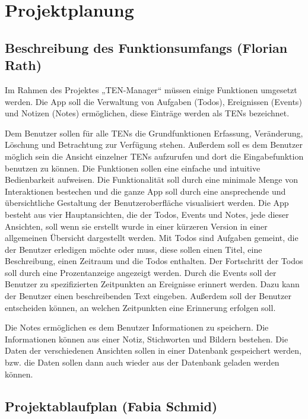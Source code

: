 \section{Projektplanung}
\label{instal}

\subsection{Beschreibung des Funktionsumfangs (Florian Rath)}

Im Rahmen des Projektes „TEN-Manager“ müssen einige Funktionen umgesetzt werden. Die App soll die Verwaltung von Aufgaben (Todos), Ereignissen (Events) und Notizen (Notes) ermöglichen, diese Einträge werden als TENs bezeichnet.

Dem Benutzer sollen für alle TENs die Grundfunktionen Erfassung, Veränderung, Löschung und Betrachtung zur Verfügung stehen. Außerdem soll es dem Benutzer möglich sein die Ansicht einzelner TENs aufzurufen und dort die Eingabefunktion benutzen zu können. Die Funktionen sollen eine einfache und intuitive Bedienbarkeit aufweisen. Die Funktionalität soll durch eine minimale Menge von Interaktionen bestechen und die ganze App soll durch eine ansprechende und übersichtliche Gestaltung der Benutzeroberfläche visualisiert werden. Die App besteht aus vier Hauptansichten, die der Todos, Events und Notes, jede dieser Ansichten, soll wenn sie erstellt wurde in einer kürzeren Version in einer allgemeinen Übersicht dargestellt werden. Mit Todos sind Aufgaben gemeint, die der Benutzer erledigen möchte oder muss, diese sollen einen Titel, eine Beschreibung, einen Zeitraum und die Todos enthalten. Der Fortschritt der Todos soll durch eine Prozentanzeige angezeigt werden. 
Durch die Events soll der Benutzer zu spezifizierten Zeitpunkten an Ereignisse erinnert werden. Dazu kann der Benutzer einen beschreibenden Text eingeben. Außerdem soll der Benutzer entscheiden können, an welchen Zeitpunkten eine Erinnerung erfolgen soll.

Die Notes ermöglichen es dem Benutzer Informationen zu speichern. Die Informationen können aus einer Notiz, Stichworten und Bildern bestehen. Die Daten der verschiedenen Ansichten sollen in einer Datenbank gespeichert werden, bzw. die Daten sollen dann auch wieder aus der Datenbank geladen werden können.

\newpage
\subsection{Projektablaufplan (Fabia Schmid)}


